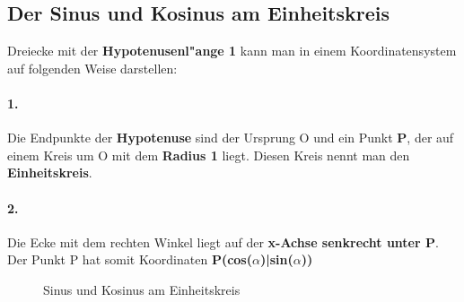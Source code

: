 \documentclass{standalone}
\begin{document}
\subsection{Der Sinus und Kosinus am Einheitskreis}
\noindent
Dreiecke mit der \textbf{Hypotenusenl{"a}nge 1} kann man in einem Koordinatensystem auf folgenden Weise darstellen:
\setlength\columnsep{20px}
\begin{multicols}{2}

	\paragraph{1. }
	Die Endpunkte der \textbf{Hypotenuse} sind der Ursprung O und ein Punkt \textbf{P}, der auf einem Kreis um O mit dem \textbf{Radius 1} liegt. Diesen Kreis nennt man den \textbf{Einheitskreis}.
	\paragraph{2. }
	Die Ecke mit dem rechten Winkel liegt auf der \textbf{x-Achse senkrecht unter P}. Der Punkt P hat somit Koordinaten \textbf{P(cos($\alpha$)|sin($\alpha$))}
\end{multicols}
\begin{figure}[hb!]
	\centering
	\def\svgwidth{250px}
	
	\caption{Sinus und Kosinus am Einheitskreis}
	\label{fig:sin_cos_einheitskreis}
\end{figure}
\end{document}
